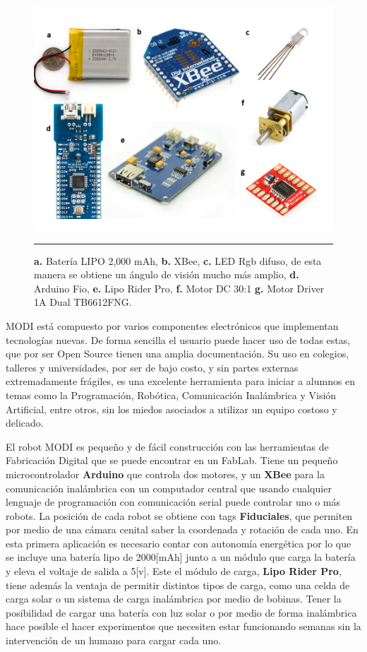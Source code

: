 \begin{figure}[htbp]
	\centering
		\includegraphics[width=\textwidth]{./Figures/MODI/compElo.png}
		\rule{35em}{0.5pt}
	\caption[Componentes Electrónicos]{\textbf{a.} Batería LIPO 2,000 mAh, \textbf{b.} XBee, \textbf{c.} LED Rgb difuso, de esta manera se obtiene un ángulo de visión mucho más amplio, \textbf{d.} Arduino Fio, \textbf{e.} Lipo Rider Pro,\textbf{ f.} Motor DC 30:1 \textbf{g.} Motor Driver 1A Dual TB6612FNG.}
	\label{fig:ledRGB}
\end{figure}

MODI está compuesto por varios componentes electrónicos que implementan tecnologías nuevas. De forma sencilla el usuario puede hacer uso de todas estas, que por ser Open Source tienen una amplia documentación. Su uso en colegios, talleres y universidades, por ser de bajo costo, y sin partes externas extremadamente frágiles, es una excelente herramienta para iniciar a alumnos en temas como la Programación, Robótica, Comunicación Inalámbrica y Visión Artificial, entre otros, sin los miedos asociados a utilizar un equipo costoso y delicado.

El robot MODI es pequeño y de fácil construcción con las herramientas de Fabricación Digital que se puede encontrar en un FabLab. Tiene un pequeño microcontrolador \textbf{Arduino} que controla dos motores, y un \textbf{XBee} para la comunicación inalámbrica con un computador central que usando cualquier lenguaje de programación con comunicación serial puede controlar uno o más robots. La posición de cada robot se obtiene con tags \textbf{Fiduciales}, que permiten por medio de una cámara cenital saber la coordenada y rotación de cada uno. En esta primera aplicación es necesario contar con autonomía energética por lo que se incluye una batería lipo de 2000[mAh] junto a un módulo que carga la batería y eleva el voltaje de salida a 5[v]. Este el módulo de carga, \textbf{Lipo Rider Pro}, tiene además la ventaja de permitir distintos tipos de carga, como una celda de carga solar o un sistema de carga inalámbrica por medio de bobinas. Tener la posibilidad de cargar una batería con luz solar o por medio de forma inalámbrica hace posible el hacer experimentos que necesiten estar funcionando semanas sin la intervención de un humano para cargar cada uno.

